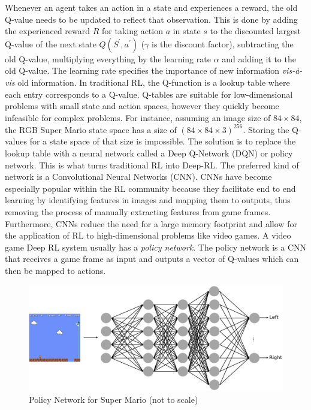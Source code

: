 \documentclass[notitlepage,a4paper,11pt]{article}
\begin{document}
Whenever an agent takes an action in a state and experiences a reward, the old Q-value needs to be updated to reflect that observation. This is done by adding the experienced reward $R$ for taking action $a$ in state $s$ to the discounted largest Q-value of the next state $Q(S^\prime, a^\prime)$ ($\gamma$ is the discount factor), subtracting the old Q-value, multiplying everything by the learning rate $\alpha$ and adding it to the old Q-value. The learning rate specifies the importance of new information \textit{vis-à-vis} old information. In traditional RL, the Q-function is a lookup table where each entry corresponds to a Q-value. Q-tables are suitable for low-dimensional problems with small state and action spaces, however they quickly become infeasible for complex problems. For instance, assuming an image size of $84 \times 84$, the RGB Super Mario state space has a size of $(84 \times 84 \times 3)^{256}$. Storing the Q-values for a state space of that size is impossible. The solution is to replace the lookup table with a neural network called a Deep Q-Network (DQN) or policy network. This is what turns traditional RL into Deep-RL. The preferred kind of network is a Convolutional Neural Networks (CNN). CNNs have become especially popular within the RL community because they facilitate end to end learning by identifying features in images and mapping them to outputs, thus removing the process of manually extracting features from game frames. Furthermore, CNNs reduce the need for a large memory footprint and allow for the application of RL to high-dimensional problems like video games. A video game Deep RL system usually has a \textit{policy network}. The policy network is a CNN that receives a game frame as input and outputs a vector of Q-values which can then be mapped to actions.

\begin{figure}[!htb]
\centering
\includegraphics[trim={0 2cm 0 2cm},clip,width=.75\linewidth]{figs/deep_rl_video_game.eps}
\caption{Policy Network for Super Mario (not to scale)} \label{fig:2}
\end{figure}
\end{document}
